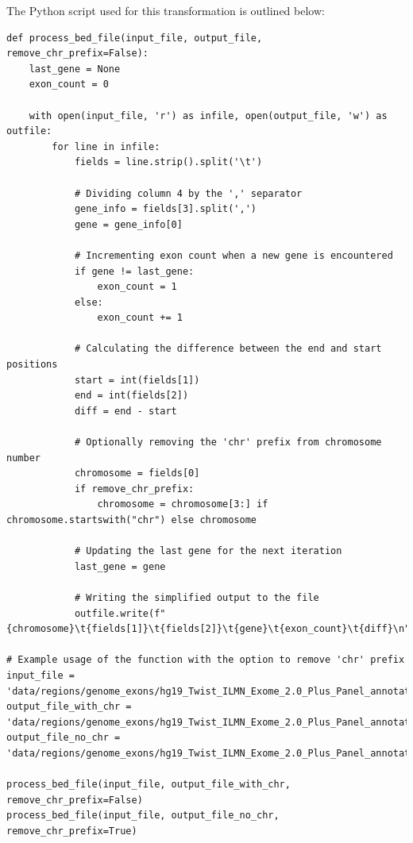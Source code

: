 The Python script used for this transformation is outlined below:

\begin{longlisting}
\begin{verbatim}
def process_bed_file(input_file, output_file, remove_chr_prefix=False):
    last_gene = None
    exon_count = 0
    
    with open(input_file, 'r') as infile, open(output_file, 'w') as outfile:
        for line in infile:
            fields = line.strip().split('\t')
            
            # Dividing column 4 by the ',' separator
            gene_info = fields[3].split(',')
            gene = gene_info[0]
            
            # Incrementing exon count when a new gene is encountered
            if gene != last_gene:
                exon_count = 1
            else:
                exon_count += 1
            
            # Calculating the difference between the end and start positions
            start = int(fields[1])
            end = int(fields[2])
            diff = end - start
            
            # Optionally removing the 'chr' prefix from chromosome number
            chromosome = fields[0]
            if remove_chr_prefix:
                chromosome = chromosome[3:] if chromosome.startswith("chr") else chromosome
            
            # Updating the last gene for the next iteration
            last_gene = gene
            
            # Writing the simplified output to the file
            outfile.write(f"{chromosome}\t{fields[1]}\t{fields[2]}\t{gene}\t{exon_count}\t{diff}\n")

# Example usage of the function with the option to remove 'chr' prefix
input_file = 'data/regions/genome_exons/hg19_Twist_ILMN_Exome_2.0_Plus_Panel_annotated.BED'
output_file_with_chr = 'data/regions/genome_exons/hg19_Twist_ILMN_Exome_2.0_Plus_Panel_annotated_modif.bed'
output_file_no_chr = 'data/regions/genome_exons/hg19_Twist_ILMN_Exome_2.0_Plus_Panel_annotated_modif_nochr.bed'

process_bed_file(input_file, output_file_with_chr, remove_chr_prefix=False)
process_bed_file(input_file, output_file_no_chr, remove_chr_prefix=True)
\end{verbatim}
\end{longlisting}

